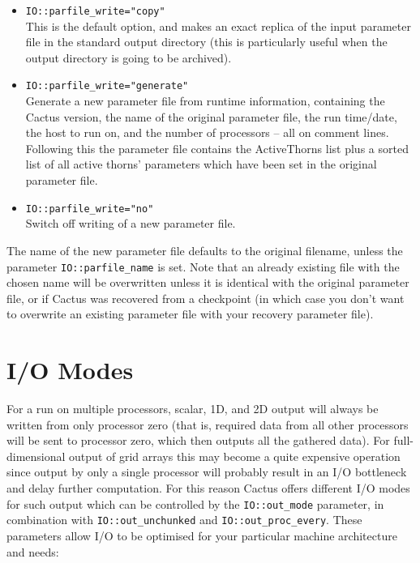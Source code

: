 \documentclass{article}
\begin{document}
\begin{itemize}

  \item{\tt IO::parfile\_write="copy"}\\
    This is the default option, and makes an exact replica of the input
    parameter file in the standard output directory (this is particularly useful
    when the output directory is going to be archived).

  \item{\tt IO::parfile\_write="generate"}\\
    Generate a new parameter file from runtime information, containing the
    Cactus version, the name of the original parameter file, the run time/date,
    the host to run on, and the number of processors -- all on comment lines.
    Following this the parameter file contains the ActiveThorns list plus a
    sorted list of all active thorns' parameters which have been set in the
    original parameter file.

  \item{\tt IO::parfile\_write="no"}\\
    Switch off writing of a new parameter file.

\end{itemize}

The name of the new parameter file defaults to the original filename, unless the
parameter {\tt IO::parfile\_name} is set. Note that an already existing file
with the chosen name will be overwritten unless it is identical with the
original parameter file, or if Cactus was recovered from a checkpoint (in which
case you don't want to overwrite an existing parameter file with your recovery
parameter file).


\section{I/O Modes}
\label{iomodes}
For a run on multiple processors, scalar, 1D, and 2D output will always be
written from only processor zero (that is, required data from all other
processors will be sent to processor zero, which then outputs all the gathered
data). For full-dimensional output of grid arrays this may become a quite expensive
operation since output by only a single processor will probably result in an
I/O bottleneck and delay further computation. For this reason Cactus offers
different I/O modes for such output which can be controlled by the
{\tt IO::out\_mode} parameter, in combination with {\tt IO::out\_unchunked}
and {\tt IO::out\_proc\_every}. These parameters allow I/O to be optimised for
your particular machine architecture and needs:
\end{document}
